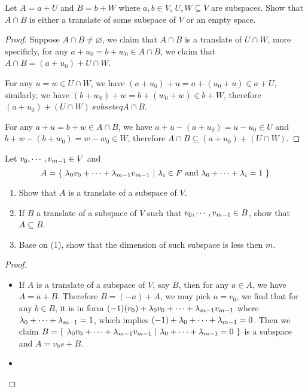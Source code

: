 \documentclass[../main.tex]{subfiles}
\begin{document}
\begin{exercise}
  Let $A = a + U$ and $B = b + W$ where $a, b \in V$, $U, W \subseteq V$ are subspaces.
  Show that $A \cap B$ is either a translate of some subspace of $V$ or an empty space.
\end{exercise}
\begin{proof}
  Suppose $A \cap B \neq \varnothing$, we claim that $A \cap B$ is a translate of $U \cap W$,
  more specificly, for any $a + u_0 = b + w_0 \in A \cap B$, we claim that
  $A \cap B = (a + u_0) + U \cap W$.

  For any $u = w \in U \cap W$, we have $(a + u_0) + u = a + (u_0 + u) \in a + U$,
  similarly, we have $(b + w_0) + w = b + (w_0 + w) \in b + W$, therefore
  $(a + u_0) + (U \cap W) \ subseteq A \cap B$.

  For any $a + u = b + w \in A \cap B$, we have $a + u - (a + u_0) = u - u_0 \in U$
  and $b + w - (b + w_0) = w - w_0 \in W$, therefore $A \cap B \subseteq (a + u_0) + (U \cap W)$.
\end{proof}

\setcounter{exercise}{11}
\begin{exercise}
  Let $\join{v}{m - 1} \in V$ and
  \[
  A = \set{\joinp[+]{\lambda}{v}{m - 1}}{ \lambda_i \in F \text{ and } \join[+]{\lambda}{i} = 1}
  \]

  \begin{enumerate}
    \item Show that $A$ is a translate of a subspace of $V$.
    \item If $B$ a translate of a subspace of $V$ such that $\join{v}{m - 1} \in B$, show that $A \subseteq B$.
    \item Base on (1), show that the dimension of such subspace is less then $m$.
  \end{enumerate}
\end{exercise}
\begin{proof}
  ~
  \begin{itemize}
    \item If $A$ is a translate of a subspace of $V$, say $B$, then for any $a \in A$,
          we have $A = a + B$. Therefore $B = (- a) + A$, we may pick $a = v_0$,
           we find that for any $b \in B$, it is in form $(-1)(v_0) + \joinp[+]{\lambda}{v}{m - 1}$
           where $\join[+]{\lambda}{m - 1} = 1$, which implies $(-1) + \join[+]{\lambda}{m - 1} = 0$.
           Then we claim $B = \set{\joinp[+]{\lambda}{v}{m - 1}}{\join[+]{\lambda}{m - 1} = 0}$
           is a subspace and $A = v_0s + B$.
    \item 
  \end{itemize}
\end{proof}
\end{document}
